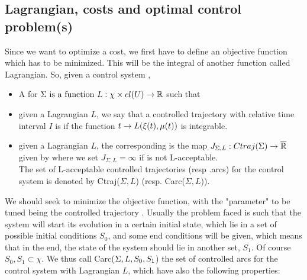 \subsection{Lagrangian, costs and optimal control problem(s)}
Since we want to optimize a cost, we first have to define an objective function which has to be minimized. This will be the integral of another function called Lagrangian. So, given a control system \controlSystem,
\begin{itemize}
	\item A  for $\Sigma\text{ is a function }L:\chi\times cl(U)\rightarrow\mathbb{R}$ such that
	
	\item given a Lagrangian $L$, we say that a controlled trajectory \controlledTrajSpaced with relative time interval $I$ is  if the function $t\rightarrow L(\xi (t),\mu(t))$ is integrable.
	
	\item given a Lagrangian $L$, the corresponding  is the map $J_{\Sigma,L}:Ctraj(\Sigma)\rightarrow\overline{\mathbb{R}}$ given by 
	where we set $J_{\Sigma,L}=\infty$ if \controlledTrajSpaced is not L-acceptable.\\
	The set of L-acceptable controlled trajectories (resp .arcs) for the control system is denoted by Ctraj($\Sigma,L$) (resp. Carc($\Sigma,L$)).
\end{itemize}

We should seek to minimize the objective function, with the "parameter" to be tuned being the controlled trajectory \controlledTraj. Usually the problem faced is such that the system will start its evolution in a certain initial state, which lie in a set of possible initial conditions $S_0$, and some end conditions will be given, which means that in the end, the state of the system should lie in another set, $S_1$. Of course $S_0,S_1\subset\chi$. We thus call Carc($\Sigma,L,S_0,S_1$) the set of controlled arcs for the control system \controlSystemSpaced with Lagrangian $L$, which have also the following properties:

